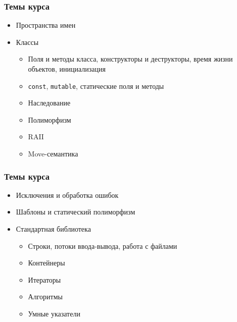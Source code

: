 \documentclass[compress]{beamer}
\begin{document}
\begin{frame}

    \frametitle{Темы курса}

    \begin{itemize}

        \item Пространства имен

        \item Классы

            \begin{itemize}

                \item Поля и методы класса, конструкторы и деструкторы,
                    время жизни объектов, инициализация

                \item \texttt{const}, \texttt{mutable}, статические поля и методы

                \item Наследование

                \item Полиморфизм

                \item RAII

                \item Move-семантика

            \end{itemize}

    \end{itemize}

\end{frame}

\begin{frame}

    \frametitle{Темы курса}

    \begin{itemize}

        \item Исключения и обработка ошибок

        \item Шаблоны и статический полиморфизм

        \item Стандартная библиотека

            \begin{itemize}

                \item Строки, потоки ввода-вывода, работа с файлами

                \item Контейнеры

                \item Итераторы

                \item Алгоритмы

                \item Умные указатели

            \end{itemize}

    \end{itemize}

\end{frame}
\end{document}
